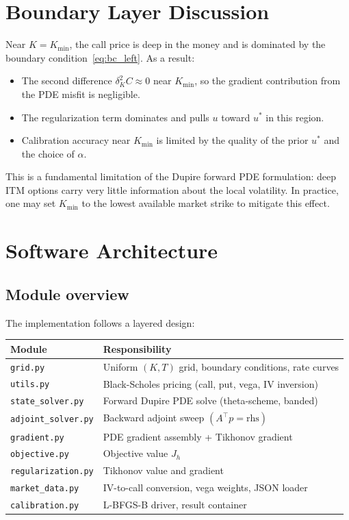 \documentclass[11pt, a4paper]{article}
\theoremstyle{definition}
\theoremstyle{plain}
\begin{document}
\section{Boundary Layer Discussion}

Near $K = K_{\min}$, the call price is deep in the money and is dominated by
the boundary condition~\eqref{eq:bc_left}. As a result:
\begin{itemize}
  \item The second difference $\delta^2_K C \approx 0$ near $K_{\min}$,
    so the gradient contribution from the PDE misfit is negligible.
  \item The regularization term dominates and pulls $u$ toward $u^*$ in
    this region.
  \item Calibration accuracy near $K_{\min}$ is limited by the quality of
    the prior $u^*$ and the choice of $\alpha$.
\end{itemize}
This is a fundamental limitation of the Dupire forward PDE formulation:
deep ITM options carry very little information about the local volatility.
In practice, one may set $K_{\min}$ to the lowest available market strike
to mitigate this effect.

\section{Software Architecture}

\subsection{Module overview}

The implementation follows a layered design:

\begin{center}
\begin{tabular}{p{3.5cm}p{9.5cm}}
\toprule
Module & Responsibility \\
\midrule
\texttt{grid.py} & Uniform $(K,T)$ grid, boundary conditions, rate curves \\
\texttt{utils.py} & Black-Scholes pricing (call, put, vega, IV inversion) \\
\texttt{state\_solver.py} & Forward Dupire PDE solve (theta-scheme, banded) \\
\texttt{adjoint\_solver.py} & Backward adjoint sweep $(A^\top p = \text{rhs})$ \\
\texttt{gradient.py} & PDE gradient assembly + Tikhonov gradient \\
\texttt{objective.py} & Objective value $J_h$ \\
\texttt{regularization.py} & Tikhonov value and gradient \\
\texttt{market\_data.py} & IV-to-call conversion, vega weights, JSON loader \\
\texttt{calibration.py} & L-BFGS-B driver, result container \\
\bottomrule
\end{tabular}
\end{center}
\end{document}
